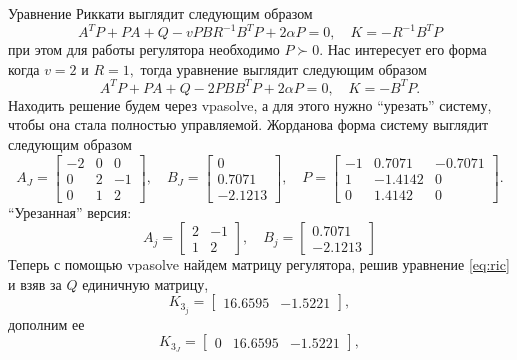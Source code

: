 Уравнение Риккати выглядит следующим образом
\begin{equation}
    A^TP+PA+Q-vPBR^{-1}B^TP+2\alpha P=0,\quad K=-R^{-1}B^TP
\end{equation}
при этом для работы регулятора необходимо $P\succ0$. Нас интересует его форма когда
$v=2$ и $R=1,$ тогда уравнение выглядит следующим образом
\begin{equation}
    A^TP+PA+Q-2PBB^TP+2\alpha P=0,\quad K=-B^TP.
    \label{eq:ric}
\end{equation}
Находить решение будем через vpasolve, а для этого нужно ``урезать'' систему,
чтобы она стала полностью управляемой. Жорданова форма систему выглядит
следующим образом
\begin{equation*}
    A_J=\begin{bmatrix}
        -2&0&0\\
        0&2&-1\\
        0&1&2
    \end{bmatrix},\quad
    B_J=\begin{bmatrix}
        0\\0.7071\\-2.1213
    \end{bmatrix},\quad
    P=\begin{bmatrix}
        -1&	0.7071&	-0.7071\\
        1&	-1.4142&	0\\
        0&	1.4142&	0
    \end{bmatrix}.
\end{equation*}
``Урезанная'' версия:
\begin{equation*}
    A_j=\begin{bmatrix}
        2&-1\\
        1&2
    \end{bmatrix},\quad
    B_j=\begin{bmatrix}
        0.7071\\-2.1213
    \end{bmatrix}
\end{equation*}
Теперь с помощью vpasolve найдем матрицу регулятора, решив уравнение \ref{eq:ric}
и взяв за $Q$ единичную матрицу,
\begin{equation*}
    K_{3_j}=\begin{bmatrix}
        16.6595& -1.5221
    \end{bmatrix},
\end{equation*}
дополним ее
\begin{equation*}
    K_{3_J}=\begin{bmatrix}
        0&16.6595& -1.5221
    \end{bmatrix},
\end{equation*}
